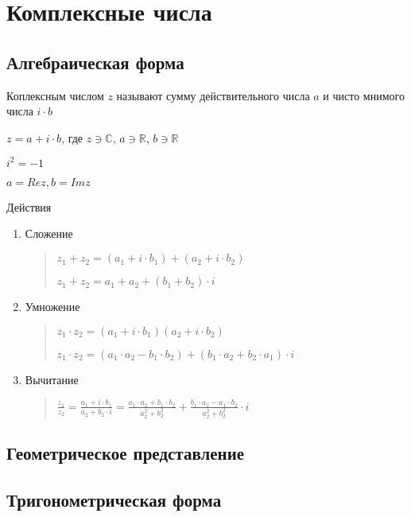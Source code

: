 


\chapter{Комплексные числа}

\section{Алгебраическая форма}

\begin{definition}
    
    Коплексным числом $z$ называют сумму действительного числа $a$ и чисто мнимого числа $i \cdot b$

    $ z = a + i \cdot b $, где $ z \ni \mathbb{C}$, $a \ni \mathbb{R}$, $b \ni \mathbb{R}$

    $i^2 = -1$

    $a = Re z, b = Im z$
\end{definition}

Действия 

\begin{enumerate}

    \item Сложение
    \begin{quotation}

        $z_1 + z_2 = (a_1 + i \cdot b_1) + (a_2 + i \cdot b_2)$

        $z_1 + z_2 = a_1 + a_2 + (b_1 + b_2) \cdot i$
    \end{quotation}
    

    \item Умножение
    \begin{quotation}
        $z_1 \cdot  z_2 = (a_{1} + i \cdot b_1)(a_2 + i \cdot b_2)$

    $z_1 \cdot  z_2  =(a_1 \cdot a_2 - b_1 \cdot b_2) + (b_1 \cdot a_2 + b_2 \cdot a_1) \cdot i$
    \end{quotation}
    


    \item Вычитание
    \begin{quotation}
        $ \frac{z_1}{z_2} = \frac{a_1 + i \cdot b_1}{a_2 + b_2 \cdot i} = \frac{a_1 \cdot a_2 + b_1 \cdot b_2}{a_2^2 + b_2^2} + \frac{b_1 \cdot a_2 - a_1 \cdot b_2}{a_2^2 + b_2^2} \cdot i$
    \end{quotation}

\end{enumerate}

\section{Геометрическое представление}

\section{Тригонометрическая форма}

\begin{definition}

    
\end{definition}

\task{}






